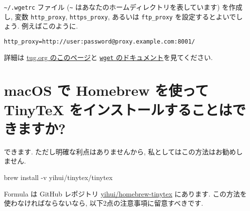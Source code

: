 \documentclass[
  xelatex,ja=standard,jafont=noto]{bxjsreport}
\newenvironment{Shaded}{\begin{snugshade}}{\end{snugshade}}
\newcommand{\AttributeTok}[1]{\textcolor[rgb]{0.77,0.63,0.00}{#1}}
\newcommand{\ExtensionTok}[1]{#1}
\newcommand{\NormalTok}[1]{#1}
\begin{document}
\texttt{\textasciitilde{}/.wgetrc} ファイル (\texttt{\textasciitilde{}}
はあなたのホームディレクトリを表しています) を作成し, 変数
\texttt{http\_proxy}, \texttt{https\_proxy}, あるいは
\texttt{ftp\_proxy} を設定するとよいでしょう. 例えばこのように.

\begin{verbatim}
http_proxy=http://user:password@proxy.example.com:8001/
\end{verbatim}

詳細は
\href{https://www.tug.org/texlive/acquire-netinstall.html}{tug.org
のこのページ}と
\href{https://www.gnu.org/software/wget/manual/html_node/Proxies.html}{\texttt{wget}
のドキュメント}を見てください.

\hypertarget{macos-ux3067-homebrew-ux3092ux4f7fux3063ux3066-tinytex-ux3092ux30a4ux30f3ux30b9ux30c8ux30fcux30ebux3059ux308bux3053ux3068ux306fux3067ux304dux307eux3059ux304b}{%
\section{macOS で Homebrew を使って TinyTeX
をインストールすることはできますか?}\label{macos-ux3067-homebrew-ux3092ux4f7fux3063ux3066-tinytex-ux3092ux30a4ux30f3ux30b9ux30c8ux30fcux30ebux3059ux308bux3053ux3068ux306fux3067ux304dux307eux3059ux304b}}

できます. ただし明確な利点はありませんから,
私としてはこの方法はお勧めしません.

\begin{Shaded}
\begin{Highlighting}[]
\ExtensionTok{brew}\NormalTok{ install }\AttributeTok{{-}v}\NormalTok{ yihui/tinytex/tinytex}
\end{Highlighting}
\end{Shaded}

Formula は GitHub レポジトリ
\href{https://github.com/yihui/homebrew-tinytex}{yihui/homebrew-tinytex}
にあります. この方法を使わなければならないなら,
以下2点の注意事項に留意すべきです.
\end{document}
